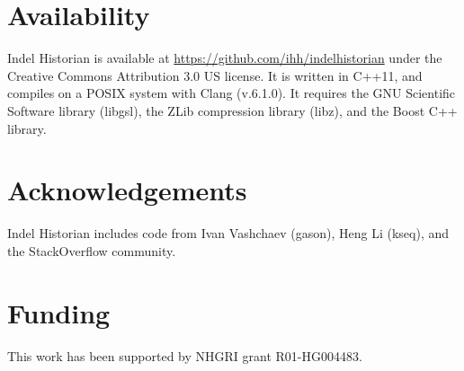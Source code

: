 \documentclass{bioinfo}
\begin{document}
\section{Availability}

Indel Historian is available at \url{https://github.com/ihh/indelhistorian} under the Creative Commons Attribution 3.0 US license. It is written in C++11, and compiles on a POSIX system with Clang (v.6.1.0). It requires the GNU Scientific Software library (libgsl), the ZLib compression library (libz), and the Boost C++ library.

\section*{Acknowledgements}

Indel Historian includes code from Ivan Vashchaev (gason), Heng Li (kseq), %
and the StackOverflow community.

\section*{Funding}

This work has been supported by NHGRI grant R01-HG004483.


%
%
%
%
%
%
%
%



\end{document}
